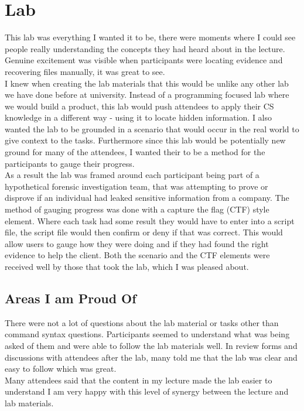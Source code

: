 \documentclass[a4paper,11pt]{article}
\begin{document}
\section{Lab}
This lab was everything I wanted it to be, there were moments where I could see people really understanding the concepts they had heard about in the lecture. Genuine excitement was visible when participants were locating evidence and recovering files manually, it was great to see. \\

I knew when creating the lab materials that this would be unlike any other lab we have done before at university. Instead of a programming focused lab where we would build a product, this lab would push attendees to apply their CS knowledge in a different way - using it to locate hidden information. I also wanted the lab to be grounded in a scenario that would occur in the real world to give context to the tasks. Furthermore since this lab would be potentially new ground for many of the attendees, I wanted their to be a method for the participants to gauge their progress.\\

As a result the lab was framed around each participant being part of a hypothetical forensic investigation team, that was attempting to prove or disprove if an individual had leaked sensitive information from a company. The method of gauging progress was done with a capture the flag (CTF) style element. Where each task had some result they would have to enter into a script file, the script file would then confirm or deny if that was correct. This would allow users to gauge how they were doing and if they had found the right evidence to help the client. Both the scenario and the CTF elements were received well by those that took the lab, which I was pleased about. 

\subsection{Areas I am Proud Of}
There were not a lot of questions about the lab material or tasks other than command syntax questions. Participants seemed to understand what was being asked of them and were able to follow the lab materials well. In review forms and discussions with attendees after the lab, many told me that the lab was clear and easy to follow which was great.\\

Many attendees said that the content in my lecture made the lab easier to understand I am very happy with this level of synergy between the lecture and lab materials. \\
\end{document}
